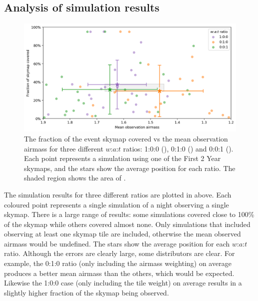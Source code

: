 
\subsection{Analysis of simulation results}
\label{sec:scheduler_sim_analysis}
\begin{colsection}

\begin{figure}[t]
    \begin{center}
        \includegraphics[width=\linewidth]{images/sched_sim1.png}
    \end{center}
    \caption[Skymap coverage vs mean airmass for different $w$:$a$:$t$ ratios]{
        The fraction of the event skymap covered vs the mean observation airmass for three different $w$:$a$:$t$ ratios: 1:0:0 (), 0:1:0 () and 0:0:1 (). Each point represents a simulation using one of the First 2 Year skymaps, and the stars show the average position for each ratio. The shaded region shows the area of .
    }\label{fig:scheduler_sim_results1}
\end{figure}

The simulation results for three different ratios are plotted in  above. Each coloured point represents a single simulation of a night observing a single skymap. There is a large range of  results: some simulations covered close to 100\% of the skymap while others covered almost none. Only simulations that included observing at least one skymap tile are included, otherwise the mean observed airmass would be undefined. The stars show the average position for each $w$:$a$:$t$ ratio. Although the errors are clearly large, some distributors are clear. For example, the 0:1:0 ratio (only including the airmass weighting) on average produces a better mean airmass than the others, which would be expected. Likewise the 1:0:0 case (only including the tile weight) on average results in a slightly higher fraction of the skymap being observed.


\end{colsection}

